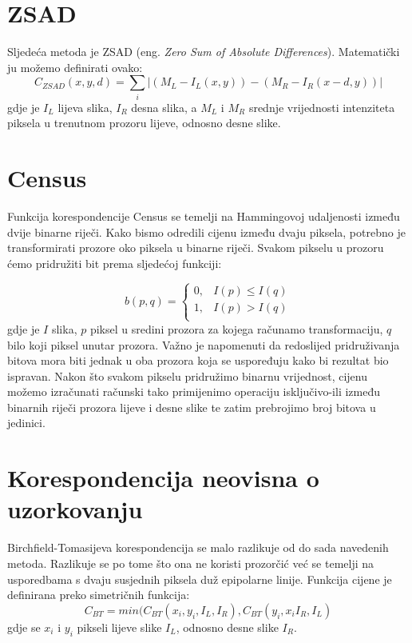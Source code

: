\documentclass[utf8, zavrsni, numeric]{fer}
\begin{document}
\section{ZSAD}

Sljedeća metoda je ZSAD ({eng. \sl Zero Sum of Absolute Differences}). Matematički ju možemo definirati ovako:
$$C_{ZSAD}(x, y, d) = \sum_{i}\lvert(M_L - I_L(x, y)) - (M_R - I_R(x - d, y))\rvert$$
gdje je $I_L$ lijeva slika, $I_R$ desna slika, a $M_L$ i $M_R$ srednje vrijednosti intenziteta piksela u trenutnom prozoru lijeve, odnosno desne slike.
\section{Census}

Funkcija korespondencije Census se temelji na Hammingovoj udaljenosti između dvije binarne riječi. Kako bismo odredili cijenu između dvaju piksela, potrebno je transformirati
prozore oko piksela u binarne riječi. Svakom pikselu u prozoru ćemo pridružiti bit prema sljedećoj funkciji:

\[   
b(p, q) = 
     \begin{cases}
       0, & I(p) \leq I(q) \\
       1, & I(p) > I(q) \\
     \end{cases}
\]
gdje je $I$ slika, $p$ piksel u sredini prozora za kojega računamo transformaciju, $q$ bilo koji piksel unutar prozora. Važno je napomenuti da redoslijed pridruživanja bitova mora biti jednak u oba
prozora koja se uspoređuju kako bi rezultat bio ispravan. Nakon što svakom pikselu pridružimo binarnu vrijednost, cijenu možemo izračunati
računski tako primijenimo operaciju isključivo-ili između binarnih riječi prozora lijeve i desne slike te zatim prebrojimo broj bitova u jedinici.

\section{Korespondencija neovisna o uzorkovanju}

Birchfield-Tomasijeva korespondencija se malo razlikuje od do sada navedenih metoda. Razlikuje se po tome što ona ne koristi prozorčić već se temelji na usporedbama s dvaju susjednih piksela duž epipolarne linije.
Funkcija cijene je definirana preko simetričnih funkcija:
$$ C_{BT} = min(C_{BT}(x_i, y_i, I_L, I_R), C_{BT}(y_i, x_i I_R, I_L) $$
gdje se $x_i$ i $y_i$ pikseli lijeve slike $I_L$, odnosno desne slike $I_R$.
\end{document}
